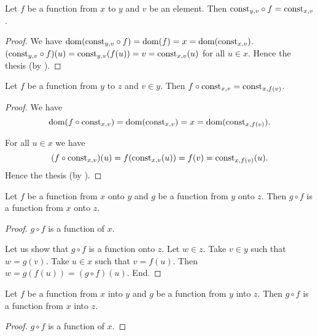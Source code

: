 \documentclass[../../set-theory.tex]{subfiles}
\begin{document}
\begin{forthel}
    \begin{proposition}\label{SetTheory_02_01_558108}
      Let $f$ be a function from $x$ to $y$ and $v$ be an element.
      Then $\mbox{const}_{y,v} \circ f = \mbox{const}_{x,v}$.
    \end{proposition}
    \begin{proof}
      We have $\operatorname{dom}(\mbox{const}_{y,v} \circ f) = \operatorname{dom}(f) = x = \operatorname{dom}(\mbox{const}_{x,v})$.
      $(\mbox{const}_{y,v} \circ f)(u) = \mbox{const}_{y,v}(f(u)) = v = \mbox{const}_{x,v}(u)$ for all $u \in x$.
      Hence the thesis (by ).
    \end{proof}

    \begin{proposition}\label{SetTheory_02_01_795869}
      Let $f$ be a function from $y$ to $z$ and $v \in y$.
      Then $f \circ \mbox{const}_{x,v} = \mbox{const}_{x,f(v)}$.
    \end{proposition}
    \begin{proof}
      We have
      \[  \operatorname{dom}(f \circ \mbox{const}_{x,v})
          = \operatorname{dom}(\mbox{const}_{x,v})
          = x
          = \operatorname{dom}(\mbox{const}_{x,f(v)}). \]

      For all $u \in x$ we have
      \[  (f \circ \mbox{const}_{x,v})(u)
          = f(\mbox{const}_{x,v}(u))
          = f(v)
          = \mbox{const}_{x,f(v)}(u). \]
      Hence the thesis (by ).
    \end{proof}

    \begin{proposition}\label{SetTheory_02_01_205975}
      Let $f$ be a function from $x$ onto $y$ and $g$ be a function from $y$ onto $z$.
      Then $g \circ f$ is a function from $x$ onto $z$.
    \end{proposition}
    \begin{proof}
      $g \circ f$ is a function of $x$.

      Let us show that $g \circ f$ is a function onto $z$.
        Let $w \in z$.
        Take $v \in y$ such that $w = g(v)$.
        Take $u \in x$ such that $v = f(u)$.
        Then $w = g(f(u)) = (g \circ f)(u)$.
      End.
    \end{proof}

    \begin{proposition}\label{SetTheory_02_01_784576}
      Let $f$ be a function from $x$ into $y$ and $g$ be a function from $y$ into $z$.
      Then $g \circ f$ is a function from $x$ into $z$.
    \end{proposition}
    \begin{proof}
      $g \circ f$ is a function of $x$.


\end{proof}
\end{forthel}
\end{document}
